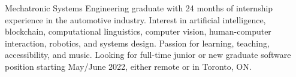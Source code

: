 

\begin{cvparagraph}

    Mechatronic Systems Engineering graduate with 24 months of internship experience in the automotive industry.
    Interest in artificial intelligence, blockchain, computational linguistics, computer vision, human-computer interaction, robotics, and systems design.
    Passion for learning, teaching, accessibility, and music.
    Looking for full-time junior or new graduate software position starting May/June 2022, either remote or in Toronto, ON.
\end{cvparagraph}

